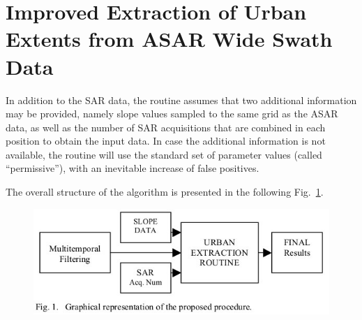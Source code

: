 \documentclass[paper=a4, fontsize=11pt]{scrartcl}
\begin{document}
\newpage

\section*{Improved Extraction of Urban Extents from ASAR Wide Swath Data}

In addition to the SAR data, the routine assumes that two additional information may be provided, namely slope values sampled to the same grid as the ASAR data, as well as the number of SAR acquisitions that are combined in each position to obtain the input data.
In case the additional information is not available, the routine will use the standard set of parameter values (called “permissive”), with an inevitable increase of false positives.

The overall structure of the algorithm is presented in the following Fig.~\ref{Fig:ExtractionRoutine}.

\begin{figure}[hbt]
	\centering
	\includegraphics[width=0.7\linewidth]{Figures/ExtractionRoutine.jpg}
	\label{Fig:ExtractionRoutine}
\end{figure}
\end{document}
